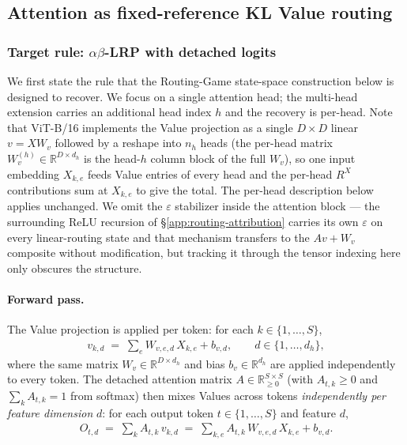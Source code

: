 \documentclass[twoside]{article}
\newcommand{\RR}{\mathbb{R}}
\newcommand{\1}{\mathbf{1}}
\begin{document}
\subsection{Attention as fixed-reference KL Value routing}\label{app:attention-kl-routing}

\subsubsection{Target rule: \texorpdfstring{$\alpha\beta$-\ac{LRP}}{LRP-alpha-beta} with detached logits}\label{app:attention-target-rule}

We first state the rule that the Routing-Game state-space construction below is designed to
recover. We focus on a single attention head; the multi-head extension carries an additional head
index $h$ and the recovery is per-head. Note that ViT-B/16 implements the Value projection as a
single $D \times D$ linear $v = X W_v$ followed by a reshape into $n_h$ heads (the per-head matrix
$W_v^{(h)} \in \RR^{D \times d_h}$ is the head-$h$ column block of the full $W_v$), so one input
embedding $X_{k,e}$ feeds Value entries of every head and the per-head $R^X$ contributions sum at
$X_{k,e}$ to give the total. The per-head description below applies unchanged. We omit the
$\varepsilon$ stabilizer inside the attention block --- the surrounding ReLU recursion of
\S\ref{app:routing-attribution} carries its own $\varepsilon$ on every linear-routing state and
that mechanism transfers to the $Av{+}W_v$ composite without modification, but tracking it through
the tensor indexing here only obscures the structure.

\paragraph{Forward pass.} The Value projection is applied per token: for each $k \in \{1,\dots,S\}$,
\begin{align}\label{eq:attn-V-forward}
    v_{k,d} \;=\; \sum_e W_{v,e,d}\, X_{k,e} + b_{v,d},
    \qquad d \in \{1,\dots,d_h\},
\end{align}
where the same matrix $W_v \in \RR^{D \times d_h}$ and bias $b_v \in \RR^{d_h}$ are applied
independently to every token. The detached attention matrix $A \in \RR^{S \times S}_{\ge 0}$ (with
$A_{t,k} \ge 0$ and $\sum_k A_{t,k} = 1$ from softmax) then mixes Values across tokens
\emph{independently per feature dimension} $d$: for each output token $t \in \{1,\dots,S\}$ and
feature $d$,
\begin{align}\label{eq:attn-AV-forward}
    O_{t,d} \;=\; \sum_k A_{t,k}\, v_{k,d}
    \;=\; \sum_{k,e} A_{t,k}\, W_{v,e,d}\, X_{k,e} + b_{v,d}.
\end{align}
\end{document}
